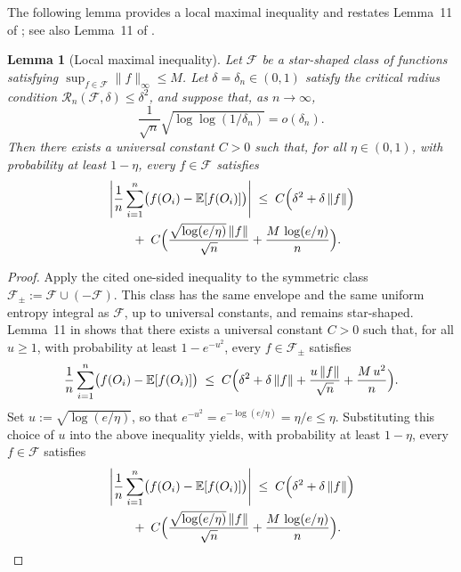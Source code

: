 \documentclass{article}
\theoremstyle{plain}
\newtheorem{lemma}{Lemma}
\theoremstyle{definition}
\theoremstyle{remark}
\begin{document}
The following lemma provides a local maximal inequality and restates Lemma~11 of
\cite{foster2023orthogonal}; see also Lemma~11 of
\citet{van2025nonparametric}.


\begin{lemma}[Local maximal inequality]\label{lemma:loc_max_ineq}
Let $\mathcal{F}$ be a star-shaped class of functions satisfying
$\sup_{f\in\mathcal{F}} \|f\|_{\infty} \le M$.
Let $\delta = \delta_n \in (0,1)$ satisfy the critical radius condition
$\mathcal{R}_n(\mathcal{F},\delta) \le \delta^2$,
and suppose that, as $n\to\infty$,
\[
\frac{1}{\sqrt{n}}\sqrt{\log\log(1/\delta_n)} = o(\delta_n).
\]
Then there exists a universal constant $C>0$ such that, for all $\eta \in (0,1)$,
with probability at least $1 - \eta$, every $f \in \mathcal{F}$ satisfies
\begin{align*}
&\left|
\frac{1}{n}\sum_{i=1}^n
\bigl(f(O_i) - \mathbb{E}[f(O_i)]\bigr)
\right|
\;\le\;
C\Bigl(
    \delta^2
    + \delta\,\|f\|
\Bigr)
\\
&\qquad+\;
C\Bigl(
    \frac{\sqrt{\log(e/\eta)}\,\|f\|}{\sqrt{n}}
    + \frac{M\,\log(e/\eta)}{n}
\Bigr).
\end{align*}
\end{lemma}
\begin{proof}
Apply the cited one-sided inequality to the symmetric class
\(\mathcal F_\pm:=\mathcal F\cup(-\mathcal F)\). This class has the same
envelope and the same uniform entropy integral as \(\mathcal F\), up to
universal constants, and remains star-shaped.
Lemma~11 in \citet{van2025nonparametric} shows that there exists a universal
constant $C>0$ such that, for all $u \ge 1$, with probability at least
$1 - e^{-u^2}$, every $f \in \mathcal{F}_\pm$ satisfies
\[
\frac{1}{n}\sum_{i=1}^n
\bigl(f(O_i) - \mathbb{E}[f(O_i)]\bigr)
\;\le\;
C\Bigl(
  \delta^2
  + \delta\,\|f\|
  + \frac{u\,\|f\|}{\sqrt{n}}
  + \frac{M\,u^2}{n}
\Bigr).
\]
Set $u := \sqrt{\log(e/\eta)}$,
so that
$
e^{-u^2}
= e^{-\log(e/\eta)}
= \eta/e
\le \eta.
$
Substituting this choice of $u$ into the above inequality yields, with
probability at least $1 - \eta$, every $f \in \mathcal{F}$ satisfies
\begin{align*}
&\left|
\frac{1}{n}\sum_{i=1}^n
\bigl(f(O_i) - \mathbb{E}[f(O_i)]\bigr)
\right|
\;\le\;
C\Bigl(
    \delta^2
    + \delta\,\|f\|
\Bigr)
\\
&\qquad+\;
C\Bigl(
    \frac{\sqrt{\log(e/\eta)}\,\|f\|}{\sqrt{n}}
    + \frac{M\,\log(e/\eta)}{n}
\Bigr).
\end{align*}
\end{proof}
\end{document}
